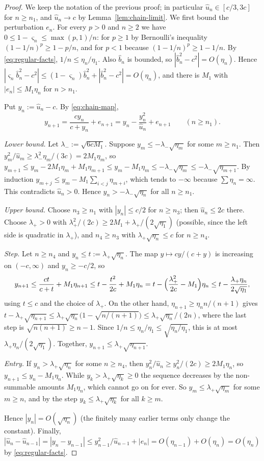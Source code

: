 \begin{proof}
We keep the notation of the previous proof; in particular $\hat u_n\in[c/3,3c]$ for $n\ge n_1$, and $\hat u_n\to c$ by
Lemma~\ref{lem:chain-limit}. We first bound the perturbation $e_n$. For every $p>0$ and $n\ge2$ we have
$0\le1-\varsigma_n\le\max(p,1)/n$: for $p\ge1$ by Bernoulli's inequality $(1-1/n)^p\ge1-p/n$, and for $p<1$ because
$(1-1/n)^p\ge1-1/n$. By \eqref{eq:regular-facts}, $1/n\le\eta_n/\eta_1$. Also $\hat b_n$ is bounded, so
$|\hat b_n^2-c^2|=O(\eta_n)$. Hence $|\varsigma_n\hat b_n^2-c^2|\le(1-\varsigma_n)\hat b_n^2+|\hat b_n^2-c^2|=O(\eta_n)$,
and there is $M_1$ with $|e_n|\le M_1\eta_n$ for $n>n_1$.

Put $y_n:=\hat u_n-c$. By \eqref{eq:chain-map},
\[
  y_{n+1}=\frac{cy_n}{c+y_n}+e_{n+1}=y_n-\frac{y_n^2}{\hat u_n}+e_{n+1}\qquad(n\ge n_1).
\]

\emph{Lower bound.} Let $\lambda_-:=\sqrt{6cM_1}$. Suppose $y_m\le-\lambda_-\sqrt{\eta_m}$ for some $m\ge n_1$. Then
$y_m^2/\hat u_m\ge\lambda_-^2\eta_m/(3c)=2M_1\eta_m$, so
$y_{m+1}\le y_m-2M_1\eta_m+M_1\eta_{m+1}\le y_m-M_1\eta_m\le-\lambda_-\sqrt{\eta_m}\le-\lambda_-\sqrt{\eta_{m+1}}$. By
induction $y_{m+j}\le y_m-M_1\sum_{i<j}\eta_{m+i}$, which tends to $-\infty$ because $\sum\eta_n=\infty$. This
contradicts $\hat u_n>0$. Hence $y_n>-\lambda_-\sqrt{\eta_n}$ for all $n\ge n_1$.

\emph{Upper bound.} Choose $n_3\ge n_1$ with $|y_n|\le c/2$ for $n\ge n_3$; then $\hat u_n\le2c$ there. Choose
$\lambda_+>0$ with $\lambda_+^2/(2c)\ge2M_1+\lambda_+/(2\sqrt{\eta_1})$ (possible, since the left side is quadratic in
$\lambda_+$), and $n_4\ge n_3$ with $\lambda_+\sqrt{\eta_n}\le c$ for $n\ge n_4$.

\emph{Step.} Let $n\ge n_4$ and $y_n\le t:=\lambda_+\sqrt{\eta_n}$. The map $y\mapsto cy/(c+y)$ is increasing on
$(-c,\infty)$ and $y_n\ge-c/2$, so
\[
  y_{n+1}\le\frac{ct}{c+t}+M_1\eta_{n+1}\le t-\frac{t^2}{2c}+M_1\eta_n
  =t-\Bigl(\frac{\lambda_+^2}{2c}-M_1\Bigr)\eta_n\le t-\frac{\lambda_+\eta_n}{2\sqrt{\eta_1}},
\]
using $t\le c$ and the choice of $\lambda_+$. On the other hand, $\eta_{n+1}\ge\eta_nn/(n+1)$ gives
$t-\lambda_+\sqrt{\eta_{n+1}}\le\lambda_+\sqrt{\eta_n}\bigl(1-\sqrt{n/(n+1)}\bigr)\le\lambda_+\sqrt{\eta_n}/(2n)$, where
the last step is $\sqrt{n(n+1)}\ge n-1$. Since $1/n\le\eta_n/\eta_1\le\sqrt{\eta_n/\eta_1}$, this is at most
$\lambda_+\eta_n/(2\sqrt{\eta_1})$. Together, $y_{n+1}\le\lambda_+\sqrt{\eta_{n+1}}$.

\emph{Entry.} If $y_n>\lambda_+\sqrt{\eta_n}$ for some $n\ge n_4$, then $y_n^2/\hat u_n\ge y_n^2/(2c)\ge2M_1\eta_n$, so
$y_{n+1}\le y_n-M_1\eta_n$. While $y_k>\lambda_+\sqrt{\eta_k}\ge0$ the sequence decreases by the non-summable amounts
$M_1\eta_n$, which cannot go on for ever. So $y_m\le\lambda_+\sqrt{\eta_m}$ for some $m\ge n$, and by the step
$y_k\le\lambda_+\sqrt{\eta_k}$ for all $k\ge m$.

Hence $|y_n|=O(\sqrt{\eta_n})$ (the finitely many earlier terms only change the constant). Finally,
$|\hat u_n-\hat u_{n-1}|=|y_n-y_{n-1}|\le y_{n-1}^2/\hat u_{n-1}+|e_n|=O(\eta_{n-1})+O(\eta_n)=O(\eta_n)$ by
\eqref{eq:regular-facts}.
\end{proof}

